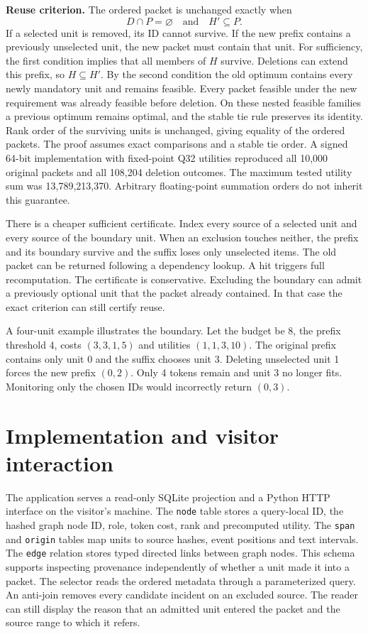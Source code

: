 \documentclass[conference]{IEEEtran}
\begin{document}
\textbf{Reuse criterion.} The ordered packet is unchanged exactly when
\[
           D\cap P=\varnothing \quad\text{and}\quad H'\subseteq P.
\]
If a selected unit is removed, its ID cannot survive. If the new prefix contains a previously unselected unit, the new packet must contain that unit. For sufficiency, the first condition implies that all members of $H$ survive. Deletions can extend this prefix, so $H\subseteq H'$. By the second condition the old optimum contains every newly mandatory unit and remains feasible. Every packet feasible under the new requirement was already feasible before deletion. On these nested feasible families a previous optimum remains optimal, and the stable tie rule preserves its identity. Rank order of the surviving units is unchanged, giving equality of the ordered packets. The proof assumes exact comparisons and a stable tie order. A signed 64-bit implementation with fixed-point Q32 utilities reproduced all 10,000 original packets and all 108,204 deletion outcomes. The maximum tested utility sum was 13,789,213,370. Arbitrary floating-point summation orders do not inherit this guarantee.

There is a cheaper sufficient certificate. Index every source of a selected unit and every source of the boundary unit. When an exclusion touches neither, the prefix and its boundary survive and the suffix loses only unselected items. The old packet can be returned following a dependency lookup. A hit triggers full recomputation. The certificate is conservative. Excluding the boundary can admit a previously optional unit that the packet already contained. In that case the exact criterion can still certify reuse.

A four-unit example illustrates the boundary. Let the budget be 8, the prefix threshold 4, costs $(3,3,1,5)$ and utilities $(1,1,3,10)$. The original prefix contains only unit 0 and the suffix chooses unit 3. Deleting unselected unit 1 forces the new prefix $(0,2)$. Only 4 tokens remain and unit 3 no longer fits. Monitoring only the chosen IDs would incorrectly return $(0,3)$.

\section{Implementation and visitor interaction}

The application serves a read-only SQLite projection and a Python HTTP interface on the visitor's machine. The \texttt{node} table stores a query-local ID, the hashed graph node ID, role, token cost, rank and precomputed utility. The \texttt{span} and \texttt{origin} tables map units to source hashes, event positions and text intervals. The \texttt{edge} relation stores typed directed links between graph nodes. This schema supports inspecting provenance independently of whether a unit made it into a packet. The selector reads the ordered metadata through a parameterized query. An anti-join removes every candidate incident on an excluded source. The reader can still display the reason that an admitted unit entered the packet and the source range to which it refers.
\end{document}
